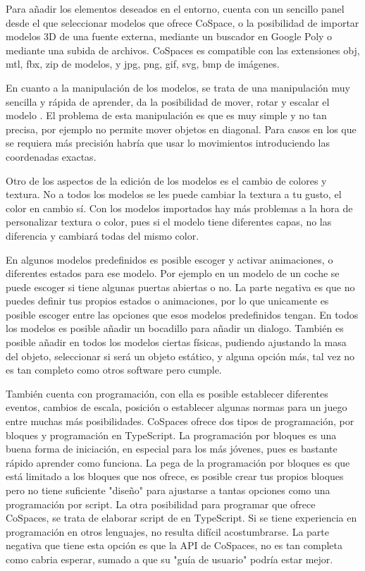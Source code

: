 Para añadir los elementos deseados en el entorno, cuenta con un sencillo panel desde el que seleccionar modelos que ofrece CoSpace, o la posibilidad de importar modelos 3D de una fuente externa, mediante un buscador en Google Poly o mediante una subida de archivos. CoSpaces es compatible con las extensiones obj, mtl, fbx, zip de modelos, y jpg, png, gif, svg, bmp de imágenes.

En cuanto a la manipulación de los modelos, se trata de una manipulación muy sencilla y rápida de aprender, da la posibilidad de mover, rotar y escalar el modelo . El problema de esta manipulación es que es muy simple y no tan precisa, por ejemplo no permite mover objetos en diagonal. Para casos en los que se requiera más precisión habría que usar lo movimientos introduciendo las coordenadas exactas.

Otro de los aspectos de la edición de los modelos es el cambio de colores y textura. No a todos los modelos se les puede cambiar la textura a tu gusto, el color en cambio sí. Con los modelos importados hay más problemas a la hora de personalizar textura o color, pues si el modelo tiene diferentes capas, no las diferencia y cambiará todas del mismo color. 

En algunos modelos predefinidos es posible escoger y activar animaciones, o diferentes estados para ese modelo. Por ejemplo en un modelo de un coche se puede escoger si tiene algunas puertas abiertas o no. La parte negativa es que no puedes definir tus propios estados o animaciones, por lo que unicamente es posible escoger entre las opciones que esos modelos predefinidos tengan. En todos los modelos es posible añadir un bocadillo para añadir un dialogo. También es posible añadir en todos los modelos ciertas físicas, pudiendo ajustando la masa del objeto, seleccionar si será un objeto estático, y alguna opción más, tal vez no es tan completo como otros software pero cumple.

También cuenta con programación, con ella es posible establecer diferentes eventos, cambios de escala, posición o establecer algunas normas para un juego entre muchas más posibilidades. CoSpaces ofrece dos tipos de programación, por bloques y programación en TypeScript. La programación por bloques es una buena forma de iniciación, en especial para los más jóvenes, pues es bastante rápido aprender como funciona. La pega de la programación por bloques es que está limitado a los bloques que nos ofrece, es posible crear tus propios bloques pero no tiene suficiente "diseño" para ajustarse a tantas opciones como una programación por script. 
La otra posibilidad para programar que ofrece CoSpaces, se trata de elaborar script de en TypeScript. Si se tiene experiencia en programación en otros lenguajes, no resulta difícil acostumbrarse. La parte negativa que tiene esta opción es que la API de CoSpaces, no es tan completa como cabria esperar, sumado a que su "guía de usuario" podría estar mejor.


